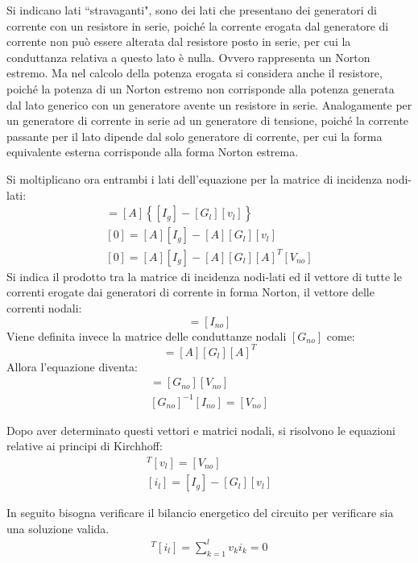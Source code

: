 \documentclass{article}
\numberwithin{equation}{subsection}
\begin{document}
Si indicano lati ``stravaganti", sono dei lati che presentano dei generatori di corrente con un resistore in serie, poiché la corrente erogata dal generatore di corrente non può 
essere alterata dal resistore posto in serie, per cui la conduttanza relativa a questo lato è nulla. Ovvero rappresenta un Norton estremo. Ma nel calcolo della potenza 
erogata si considera anche il resistore, poiché la potenza di un Norton estremo non corrisponde alla potenza generata dal lato generico con un generatore avente un resistore in 
serie. 
Analogamente per un generatore di corrente in serie ad un generatore di tensione, poiché la corrente passante per il lato dipende dal solo generatore di corrente, per cui la 
forma equivalente esterna corrisponde alla forma Norton estrema. 

Si moltiplicano ora entrambi i lati dell'equazione per la matrice di incidenza nodi-lati:
\begin{gather*}
    [A][i_l]=[A]\left\{[I_g]-[G_l][v_l]\right\}\\
    [0]=[A][I_g]-[A][G_l][v_l]\\
    [0]=[A][I_g]-[A][G_l][A]^T[V_{no}]
\end{gather*}
Si indica il prodotto tra la matrice di incidenza nodi-lati ed il vettore di tutte le correnti erogate dai generatori di corrente in forma Norton, il vettore delle correnti 
nodali:
\begin{equation*}
    [A][I_g]=[I_{no}]
\end{equation*}
Viene definita invece la matrice delle conduttanze nodali $[G_{no}]$ come:
\begin{equation*}
    [G_{no}]=[A][G_l][A]^T
\end{equation*}
Allora l'equazione diventa:
\begin{gather*}
    [I_{no}]=[G_{no}][V_{no}]\\
    [G_{no}]^{-1}[I_{no}]=[V_{no}]
\end{gather*}

Dopo aver determinato questi vettori e matrici nodali, si risolvono le equazioni relative ai principi di Kirchhoff: 
\begin{gather*}
    [A]^T[v_l]=[V_{no}]\\
    [i_l]=[I_g]-[G_l][v_l]
\end{gather*}

In seguito bisogna verificare il bilancio energetico del circuito per verificare sia una soluzione valida. 
\begin{gather*}
    [v_l]^T[i_l]=\displaystyle\sum_{k=1}^lv_ki_k=0
\end{gather*}
\end{document}
